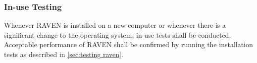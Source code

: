 \subsubsection{In-use Testing}
Whenever RAVEN is installed on a new computer or whenever there is a significant change to the operating system, 
in-use tests shall be conducted.
Acceptable performance of RAVEN shall be confirmed by running the installation tests as described in  \ref{sec:testing raven}.
